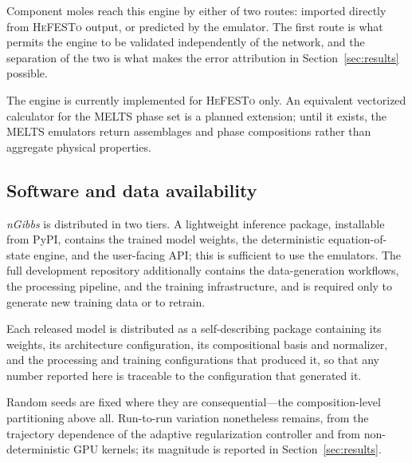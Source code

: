 Component moles reach this engine by either of two routes: imported directly from
\textsc{HeFESTo} output, or predicted by the emulator. The first route is what permits
the engine to be validated independently of the network, and the separation of the two
is what makes the error attribution in Section~\ref{sec:results} possible.

The engine is currently implemented for \textsc{HeFESTo} only. An equivalent
vectorized calculator for the \textsc{MELTS} phase set is a planned extension; until
it exists, the \textsc{MELTS} emulators return assemblages and phase compositions
rather than aggregate physical properties.


\subsection{Software and data availability}
\label{sec:availability}

\emph{nGibbs} is distributed in two tiers. A lightweight inference package,
installable from PyPI, contains the trained model weights, the deterministic
equation-of-state engine, and the user-facing API; this is sufficient to use the
emulators. The full development repository additionally contains the data-generation
workflows, the processing pipeline, and the training infrastructure, and is required
only to generate new training data or to retrain.


Each released model is distributed as a self-describing package containing its
weights, its architecture configuration, its compositional basis and normalizer, and
the processing and training configurations that produced it, so that any number
reported here is traceable to the configuration that generated it.


Random seeds are fixed where they are consequential---the composition-level
partitioning above all. Run-to-run variation nonetheless remains, from the trajectory
dependence of the adaptive regularization controller and from non-deterministic GPU
kernels; its magnitude is reported in Section~\ref{sec:results}.
